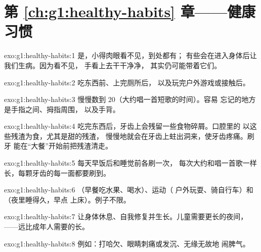 \section*{第 \ref{ch:g1:healthy-habits} 章——健康习惯}

\begin{solution}{exo:g1:healthy-habits:1}
是，小得肉眼看不见，到处都有；
有些会在进入身体后让我们生病。因为看不见，
手看上去干干净净，
其实仍可能带着它们。
\end{solution}

\begin{solution}{exo:g1:healthy-habits:2}
吃东西前、上完厕所后，
以及玩完户外游戏或接触后。
\end{solution}

\begin{solution}{exo:g1:healthy-habits:3}
慢慢数到 $20$（大约唱一首短歌的时间）。容易
忘记的地方是手指之间、拇指周围，
以及手背。
\end{solution}

\begin{solution}{exo:g1:healthy-habits:4}
吃完东西后，牙齿上会残留一些食物碎屑。口腔里的
以这些残渣为食，尤其是甜的残渣，
慢慢地就会在牙齿上蛀出洞来，使牙齿疼痛。刷牙
能在“大餐”开始前把残渣清走。
\end{solution}

\begin{solution}{exo:g1:healthy-habits:5}
每天早饭后和睡觉前各刷一次，
每次大约和唱一首歌一样长，每颗牙齿的每一面都要刷到。
\end{solution}

\begin{solution}{exo:g1:healthy-habits:6}
（早餐吃水果、喝水）、运动（
户外玩耍、骑自行车）和（夜里睡得久，早点
上床）。例子不限。
\end{solution}

\begin{solution}{exo:g1:healthy-habits:7}
让身体休息、自我修复并生长。儿童需要更长的夜间，
——远比成年人需要的长。
\end{solution}

\begin{solution}{exo:g1:healthy-habits:8}
例如：打哈欠、眼睛刺痛或发沉、无缘无故地
闹脾气。
\end{solution}

